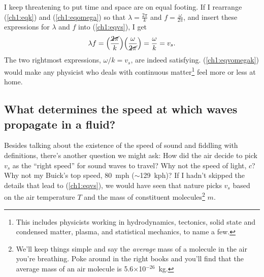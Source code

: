 

I keep threatening to put time and space are on equal footing. If I rearrange
(\ref{ch1:eqk}) and (\ref{ch1:eqomega}) so that $\lambda = \frac{2 \pi}{k}$ and
$f = \frac{\omega}{2 \pi}$, and insert these expressions for $\lambda$ and $f$
into (\ref{ch1:eqvs}), I get
\begin{equation}
  \label{ch1:eqvomegak}
  \lambda f = \Big ( \dfrac{\cancel{2 \pi}}{k} \Big ) \Big ( \dfrac{\omega}{\cancel{2 \pi}} \Big ) = \dfrac{\omega}{k} = v_s.
\end{equation}
The two rightmost expressions, $\omega / k = v_s$, are indeed
satisfying. (\ref{ch1:eqvomegak}) would make any physicist who deals with
continuous matter\footnote{This includes physicists working in hydrodynamics,
  tectonics, solid state and condensed matter, plasma, and statistical
  mechanics, to name a few.} feel more or less at home.

\subsection{What determines the speed at which waves propagate in a fluid?}
\label{subsec:wavspeed}

Besides talking about the existence of the speed of sound and fiddling with
definitions, there's another question we might ask: How did the air decide to
pick $v_s$ as the ``right speed'' for sound waves to travel? Why not the speed
of light, $c$? Why not my Buick's top speed, 80~mph ($\sim$129~kph)? If I hadn't
skipped the details that lead to (\ref{ch1:eqvs}), we would have seen
that nature picks $v_s$ based on the air temperature $T$ and the mass of
constituent molecules\footnote{We'll keep things simple and say the
  \emph{average} mass of a molecule in the air you're breathing. Poke around in
  the right books and you'll find that the average mass of an air molecule is
  5.6$\times$10$^{-26}$~kg.} $m$.

